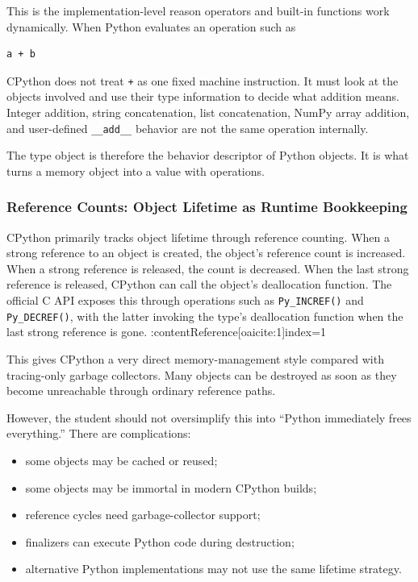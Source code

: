 This is the implementation-level reason operators and built-in functions work dynamically. When Python evaluates an operation such as

\begin{verbatim}
a + b
\end{verbatim}

CPython does not treat \texttt{+} as one fixed machine instruction. It must look at the objects involved and use their type information to decide what addition means. Integer addition, string concatenation, list concatenation, NumPy array addition, and user-defined \texttt{\_\_add\_\_} behavior are not the same operation internally.

The type object is therefore the behavior descriptor of Python objects. It is what turns a memory object into a value with operations.

\subsubsection{Reference Counts: Object Lifetime as Runtime Bookkeeping}

CPython primarily tracks object lifetime through reference counting. When a strong reference to an object is created, the object's reference count is increased. When a strong reference is released, the count is decreased. When the last strong reference is released, CPython can call the object's deallocation function. The official C API exposes this through operations such as \texttt{Py\_INCREF()} and \texttt{Py\_DECREF()}, with the latter invoking the type's deallocation function when the last strong reference is gone. :contentReference[oaicite:1]{index=1}

This gives CPython a very direct memory-management style compared with tracing-only garbage collectors. Many objects can be destroyed as soon as they become unreachable through ordinary reference paths.

However, the student should not oversimplify this into ``Python immediately frees everything.'' There are complications:

\begin{itemize}
    \item some objects may be cached or reused;
    \item some objects may be immortal in modern CPython builds;
    \item reference cycles need garbage-collector support;
    \item finalizers can execute Python code during destruction;
    \item alternative Python implementations may not use the same lifetime strategy.
\end{itemize}

